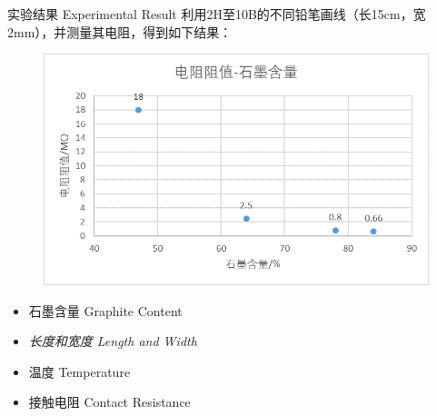 \documentclass[10pt]{beamer}
\begin{document}
	
	\begin{frame}{实验结果 Experimental Result}
		利用2H至10B的不同铅笔画线（长15cm，宽2mm），并测量其电阻，得到如下结果：
		\begin{figure}
			\includegraphics[width=0.8\linewidth]{figs/image1}
		\end{figure}
	\end{frame}
	
	
	\begin{frame}%
		\begin{itemize}
			
			\item 石墨含量 Graphite Content
			\item {\LARGE \textit{长度和宽度 Length and Width}}
			\item 温度 Temperature
			\item 接触电阻 Contact Resistance
		\end{itemize}
	\end{frame}
	
	
\end{document}
